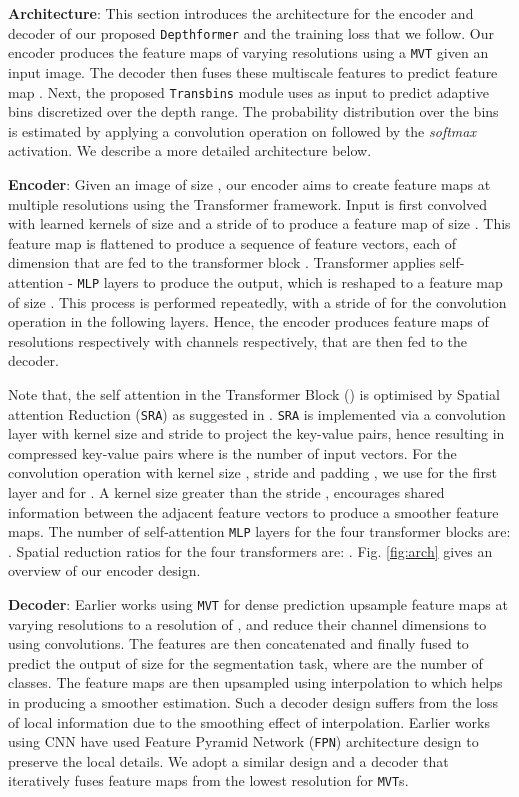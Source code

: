 \documentclass{article}
\newcommand{\myfirstpara}[1]{\noindent \textbf{#1}:}
\newcommand{\mypara}[1]{\vspace{0.5em} \myfirstpara{#1}}
\newcommand{\Depthformer}{\texttt{Depthformer}\xspace}
\newcommand{\Transbins}{\texttt{Transbins}\xspace}
\newcommand{\MLP}{\texttt{MLP}\xspace}
\newcommand{\MVT}{\texttt{MVT}\xspace}
\newcommand{\MVTs}{\texttt{MVT}s\xspace}
\begin{document}
\mypara{Architecture}
This section introduces the architecture for the encoder and decoder of our proposed \Depthformer and the training loss that we follow. Our encoder produces the feature maps of varying resolutions using a \MVT given an input image. The decoder then fuses these multiscale features to predict feature map . Next, the proposed \Transbins module uses  as input to predict adaptive bins  discretized over the depth range. The probability distribution over the bins is estimated by applying a convolution operation on  followed by the \textit{softmax} activation. We describe a more detailed architecture below. 


\mypara{Encoder}
\label{sec:enc}
Given an image  of size , our encoder aims to create feature maps at multiple resolutions using the Transformer framework.
Input  is first convolved with learned  kernels of size  and a stride of  to produce a feature map of size . This feature map is flattened to produce a sequence of  feature vectors, each of dimension  that are fed to the transformer block . Transformer  applies  self-attention - \texttt{MLP} layers to produce the output, which is reshaped to a feature map  of size . This process is performed repeatedly, with a stride of  for the convolution operation in the following layers. Hence, the encoder produces feature maps  of resolutions  respectively with channels  respectively, that are then fed to the decoder. 


Note that, the self attention in the Transformer Block () is optimised by Spatial attention Reduction (\texttt{SRA}) as suggested in \cite{pvtv1}. \texttt{SRA} is implemented via a convolution layer with kernel size  and stride  to project the key-value pairs, hence resulting in  compressed key-value pairs where  is the number of input vectors. For the convolution operation with kernel size , stride  and padding , we use  for the first layer and  for . A kernel size  greater than the stride , encourages shared information between the adjacent feature vectors to produce a smoother feature maps. The number of self-attention \MLP layers for the four transformer blocks are: . Spatial reduction ratios for the four transformers are: . Fig. \ref{fig:arch} gives an overview of our encoder design.

\mypara{Decoder}
Earlier works using \MVT for dense prediction \cite{segformer}  upsample feature maps at varying resolutions to a resolution of , and reduce their channel dimensions to  using  convolutions. The features are then concatenated and finally fused to predict the output of size  for the segmentation task, where  are the number of classes. The feature maps are then upsampled using interpolation to  which helps in producing a smoother estimation.
Such a decoder design suffers from the loss of local information due to the smoothing effect of interpolation. Earlier works using CNN have used Feature Pyramid Network (\texttt{FPN}) \cite{fpn} architecture design to preserve the local details. We adopt a similar design and a decoder that iteratively fuses feature maps from the lowest resolution for \MVTs.
\end{document}
